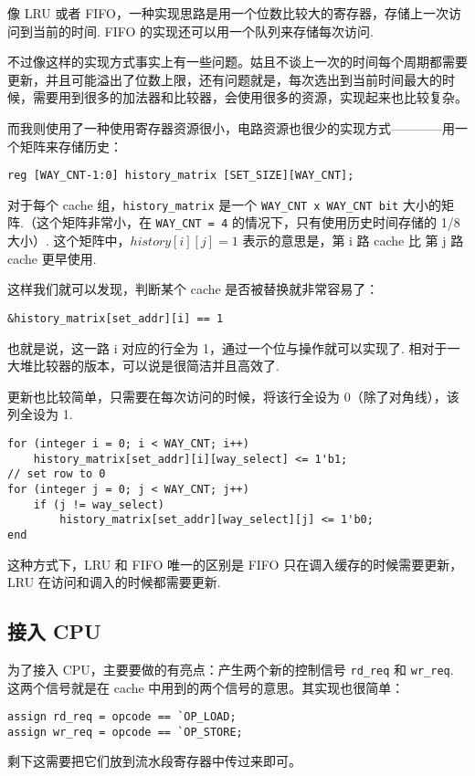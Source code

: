 \documentclass{article}
\begin{document}
像 LRU 或者 FIFO，一种实现思路是用一个位数比较大的寄存器，存储上一次访问到当前的时间. FIFO 的实现还可以用一个队列来存储每次访问.

不过像这样的实现方式事实上有一些问题。姑且不谈上一次的时间每个周期都需要更新，并且可能溢出了位数上限，还有问题就是，每次选出到当前时间最大的时候，需要用到很多的加法器和比较器，会使用很多的资源，实现起来也比较复杂。

而我则使用了一种使用寄存器资源很小，电路资源也很少的实现方式————用一个矩阵来存储历史：
\begin{verbatim}
reg [WAY_CNT-1:0] history_matrix [SET_SIZE][WAY_CNT];
\end{verbatim}
对于每个 cache 组，\texttt{history_matrix} 是一个 \texttt{WAY_CNT x WAY_CNT bit} 大小的矩阵.（这个矩阵非常小，在 \texttt{WAY_CNT = 4} 的情况下，只有使用历史时间存储的 1/8 大小）. 这个矩阵中，$history[i][j] = 1$ 表示的意思是，第 i 路 cache 比 第 j 路 cache 更早使用.

这样我们就可以发现，判断某个 cache 是否被替换就非常容易了：
\begin{verbatim}
&history_matrix[set_addr][i] == 1
\end{verbatim}
也就是说，这一路 i 对应的行全为 1，通过一个位与操作就可以实现了. 相对于一大堆比较器的版本，可以说是很简洁并且高效了.

更新也比较简单，只需要在每次访问的时候，将该行全设为 0（除了对角线），该列全设为 1.
\begin{verbatim}
for (integer i = 0; i < WAY_CNT; i++)
    history_matrix[set_addr][i][way_select] <= 1'b1;
// set row to 0
for (integer j = 0; j < WAY_CNT; j++)
    if (j != way_select)
        history_matrix[set_addr][way_select][j] <= 1'b0;
end
\end{verbatim}
这种方式下，LRU 和 FIFO 唯一的区别是 FIFO 只在调入缓存的时候需要更新，LRU 在访问和调入的时候都需要更新.

\subsection{接入 CPU}
为了接入 CPU，主要要做的有亮点：产生两个新的控制信号 \texttt{rd_req} 和 \texttt{wr_req}. 这两个信号就是在 cache 中用到的两个信号的意思。其实现也很简单：
\begin{verbatim}
assign rd_req = opcode == `OP_LOAD;
assign wr_req = opcode == `OP_STORE;
\end{verbatim}
剩下这需要把它们放到流水段寄存器中传过来即可。
\end{document}
